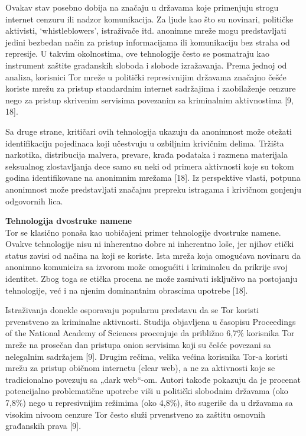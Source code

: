 \documentclass[
]{article}
\begin{document}
Ovakav stav posebno dobija na značaju u državama koje primenjuju strogu
internet cenzuru ili nadzor komunikacija. Za ljude kao što su novinari,
političke aktivisti, `whistleblowers', istraživače itd. anonimne mreže
mogu predstavljati jedini bezbedan način za pristup informacijama ili
komunikaciju bez straha od represije. U takvim okolnostima, ove
tehnologije često se posmatraju kao instrument zaštite građanskih
sloboda i slobode izražavanja. Prema jednoj od analiza, korisnici Tor
mreže u politički represivnijim državama značajno češće koriste mrežu za
pristup standardnim internet sadržajima i zaobilaženje cenzure nego za
pristup skrivenim servisima povezanim sa kriminalnim aktivnostima {[}9,
18{]}.

Sa druge strane, kritičari ovih tehnologija ukazuju da anonimnost može
otežati identifikaciju pojedinaca koji učestvuju u ozbiljnim krivičnim
delima. Tržišta narkotika, distribucija malvera, prevare, krađa podataka
i razmena materijala seksualnog zlostavljanja dece samo su neki od
primera aktivnosti koje su tokom godina identifikovane na anonimnim
mrežama {[}18{]}. Iz perspektive vlasti, potpuna anonimnost može
predstavljati značajnu prepreku istragama i krivičnom gonjenju
odgovornih lica.

\textbf{Tehnologija dvostruke namene}\\
Tor se klasično ponaša kao uobičajeni primer tehnologije dvostruke
namene. Ovakve tehnologije nisu ni inherentno dobre ni inherentno loše,
jer njihov etički status zavisi od načina na koji se koriste. Ista mreža
koja omogućava novinaru da anonimno komunicira sa izvorom može omogućiti
i kriminalcu da prikrije svoj identitet. Zbog toga se etička procena ne
može zasnivati isključivo na postojanju tehnologije, već i na njenim
dominantnim obrascima upotrebe {[}18{]}.

Istraživanja donekle osporavaju popularnu predstavu da se Tor koristi
prvenstveno za kriminalne aktivnosti. Studija objavljena u časopisu
Proceedings of the National Academy of Sciences procenjuje da približno
6,7\% korisnika Tor mreže na prosečan dan pristupa onion servisima koji
su češće povezani sa nelegalnim sadržajem {[}9{]}. Drugim rečima, velika
većina korisnika Tor-a koristi mrežu za pristup običnom internetu (clear
web), a ne za aktivnosti koje se tradicionalno povezuju sa „dark
web``-om. Autori takođe pokazuju da je procenat potencijalno
problematične upotrebe viši u politički slobodnim državama (oko 7,8\%)
nego u represivnijim režimima (oko 4,8\%), što sugeriše da u državama sa
visokim nivoom cenzure Tor često služi prvenstveno za zaštitu osnovnih
građanskih prava {[}9{]}.
\end{document}
